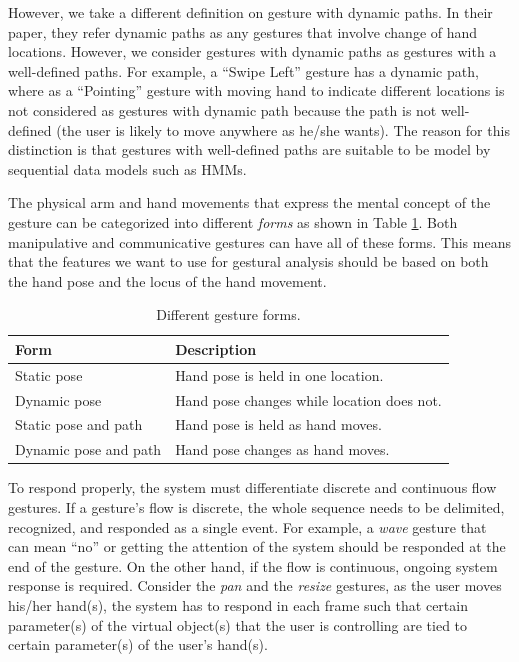 However, we take a different definition on gesture with dynamic paths. In their
paper, they refer dynamic paths as any gestures that involve change of hand
locations. However, we consider gestures with dynamic paths as gestures with a
well-defined paths. For example, a ``Swipe Left'' gesture has a dynamic path,
where as a ``Pointing'' gesture with moving hand to indicate different locations
is not considered as gestures with dynamic path because the path is not
well-defined (the user is likely to move anywhere as he/she wants). The reason
for this distinction is that gestures with well-defined paths are suitable to be
model by sequential data models such as HMMs.

The physical arm and hand movements that express
the mental concept of the gesture can be categorized into different \textit{forms} \cite{wobbrock09} as shown in Table \ref{tab:form}. Both manipulative and communicative gestures can
have all of these forms. This means that the features we want to use for
gestural analysis should be based on both the hand pose and the locus of the
hand movement.

\begin{table}[h]
  \centering
  \begin{tabular}{| l | l |}
  	\hline
  	\textbf{Form} 		  & \textbf{Description} \\ \hline 
  	Static pose  		  & Hand pose is held in one location. \\ \hline
  	Dynamic pose 		  & Hand pose changes while location does not. \\ \hline
  	Static pose and path  & Hand pose is held as hand moves. \\ \hline
  	Dynamic pose and path & Hand pose changes as hand moves. \\ \hline
  \end{tabular}
  \caption{Different gesture forms.}
  \label{tab:form}
\end{table}

To respond properly, the system must differentiate discrete and continuous
flow gestures. If a gesture's flow
is discrete, the whole sequence needs to be delimited, recognized, and responded
as a single event. For example, a \textit{wave} gesture that can mean ``no'' or getting the attention of the 
system should be responded at the end of the gesture. On the other hand, if the 
flow is continuous, ongoing system response is required. Consider the \textit{pan} and the \textit{resize} gestures, 
as the user moves his/her hand(s), the system has to respond in each frame such that
certain parameter(s) of the virtual object(s) that the user is controlling are tied to
certain parameter(s) of the user's hand(s).

